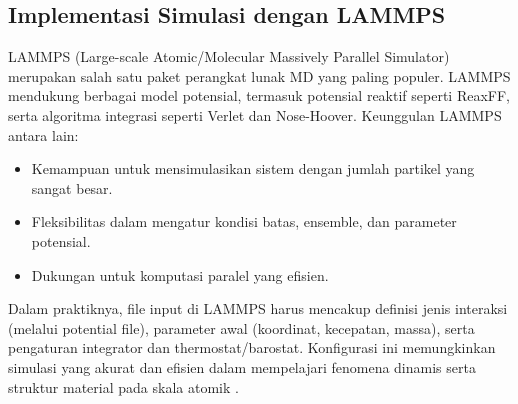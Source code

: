 \subsection{Implementasi Simulasi dengan LAMMPS}
LAMMPS (Large-scale Atomic/Molecular Massively Parallel Simulator) merupakan salah satu paket perangkat lunak MD yang paling populer.
LAMMPS mendukung berbagai model potensial, termasuk potensial reaktif seperti ReaxFF, serta algoritma integrasi seperti Verlet dan Nose-Hoover.
Keunggulan LAMMPS antara lain:
\begin{itemize}
    \item Kemampuan untuk mensimulasikan sistem dengan jumlah partikel yang sangat besar.
    \item Fleksibilitas dalam mengatur kondisi batas, ensemble, dan parameter potensial.
    \item Dukungan untuk komputasi paralel yang efisien.
\end{itemize}
Dalam praktiknya, file input di LAMMPS harus mencakup definisi jenis interaksi (melalui potential file), parameter awal (koordinat, kecepatan, massa), serta pengaturan integrator dan thermostat/barostat.
Konfigurasi ini memungkinkan simulasi yang akurat dan efisien dalam mempelajari fenomena dinamis serta struktur material pada skala atomik \citep{Plimpton1995}.

